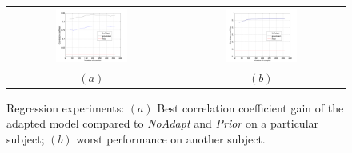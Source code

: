 \begin{figure}[ht] \centering
  \begin{tabular}{cc}
    \includegraphics[width=0.45\textwidth]{figs/exp2_abs_best} &
    \includegraphics[width=0.45\textwidth]{figs/exp2_abs_worst} \\
    $(a)$ & $(b)$ \\
  \end{tabular}
  \caption{Regression experiments: $(a)$ Best correlation coefficient gain of the adapted model compared to \emph{NoAdapt}
 and \emph{Prior} on a particular subject; $(b)$ worst performance on another subject.}
  \label{fig:reg_abs}
\end{figure}
